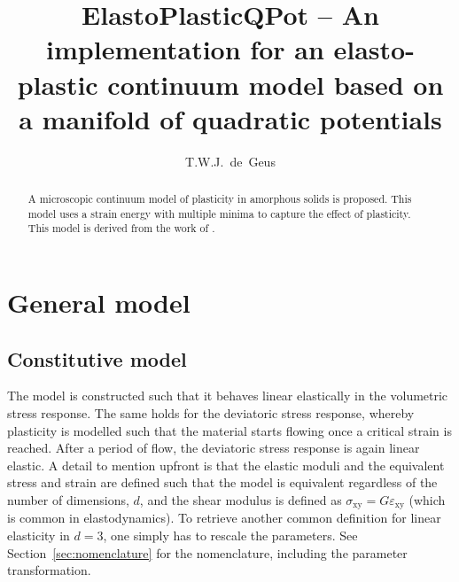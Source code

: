 \documentclass[times,namecite]{goose-article}
\title{%
  ElastoPlasticQPot -- An implementation for an elasto-plastic continuum model based on a manifold of quadratic potentials
}
\author{T.W.J.~de~Geus}
\begin{document}
\maketitle

\begin{abstract}
A microscopic continuum model of plasticity in amorphous solids is proposed. This model uses a strain energy with multiple minima to capture the effect of plasticity. This model is derived from the work of \citet{Jagla2017}.
\end{abstract}


\setcounter{tocdepth}{3}
\tableofcontents

\vfill\newpage
\section{General model}

\subsection{Constitutive model}

The model is constructed such that it behaves linear elastically in the volumetric stress response. The same holds for the deviatoric stress response, whereby plasticity is modelled such that the material starts flowing once a critical strain is reached. After a period of flow, the deviatoric stress response is again linear elastic. A detail to mention upfront is that the elastic moduli and the equivalent stress and strain are defined such that the model is equivalent regardless of the number of dimensions, $d$, and the shear modulus is defined as $\sigma_\mathrm{xy} = G \varepsilon_\mathrm{xy}$ (which is common in elastodynamics). To retrieve another common definition for linear elasticity in $d = 3$, one simply has to rescale the parameters. See Section~\ref{sec:nomenclature} for the nomenclature, including the parameter transformation.
\end{document}

